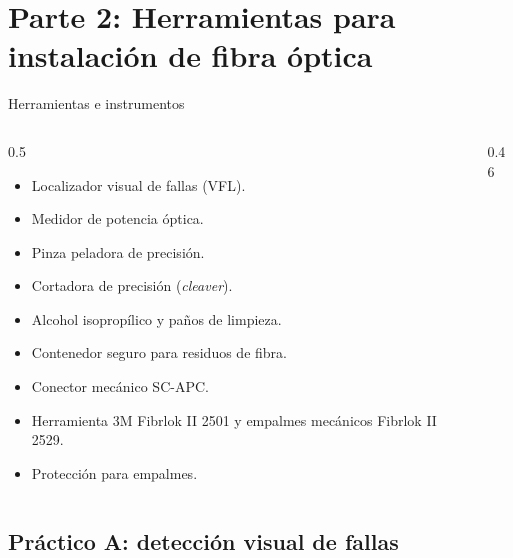 \documentclass[aspectratio=169,10pt]{beamer}
\begin{document}
\section{Parte 2: Herramientas para instalación de fibra óptica}

\begin{frame}{Herramientas e instrumentos}
  \begin{columns}[T]
    \begin{column}{0.5\textwidth}
      \begin{itemize}
        \item Localizador visual de fallas (VFL).
        \item Medidor de potencia óptica.
        \item Pinza peladora de precisión.
        \item Cortadora de precisión (\emph{cleaver}).
        \item Alcohol isopropílico y paños de limpieza.
        \item Contenedor seguro para residuos de fibra.
        \item Conector mecánico SC-APC.
        \item Herramienta 3M Fibrlok II 2501 y empalmes mecánicos Fibrlok II 2529.
        \item Protección para empalmes.
      \end{itemize}
    \end{column}
    \begin{column}{0.46\textwidth}
    \end{column}
  \end{columns}
\end{frame}

\subsection{Práctico A: detección visual de fallas}
\end{document}
